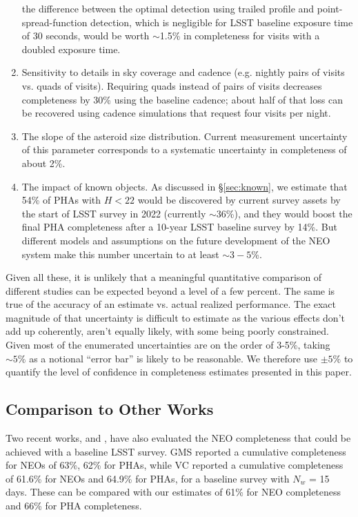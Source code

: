 \begin{enumerate}
          the difference between the optimal detection using trailed profile and point-spread-function
          detection, which is negligible for LSST baseline exposure time of 30 seconds, would be worth $\sim$1.5\%
          in completeness for visits with a doubled exposure time.
\item Sensitivity to details in sky coverage and cadence (e.g. nightly pairs of visits vs. quads of visits).
          Requiring quads instead of pairs of visits decreases completeness by 30\% using the baseline cadence;
          about half of that loss can be recovered using cadence simulations that request four visits per night.
\item The slope of the asteroid size distribution. Current measurement uncertainty of this parameter
          corresponds to a systematic uncertainty in completeness of about 2\%.
\item The impact of known objects. As discussed in \S\ref{sec:known}, we estimate that 54\% of PHAs with $H<22$ would be discovered
          by current survey assets by the start of LSST survey in 2022 (currently $\sim$36\%), and they would
          boost the final PHA completeness after a 10-year LSST baseline survey by 14\%. But different models and assumptions on the future development of the NEO system make this number uncertain to at least $\sim 3-5$\%.
\end{enumerate}

Given all these, it is unlikely that a meaningful quantitative comparison of different studies can be expected beyond a level of a few percent. The same is true of the accuracy of an estimate vs. actual realized performance. The exact magnitude of that uncertainty is difficult to estimate as the various effects don't add up coherently, aren't equally likely, with some being poorly constrained. Given most of the enumerated uncertainties are on the order of 3-5\%, taking $\sim 5\%$ as a notional ``error bar'' is likely to be reasonable. We therefore use $\pm 5\%$ to quantify the level of confidence in completeness estimates presented in this paper.

\subsection{Comparison to Other Works  \label{sec:other}}

Two recent works, \citet*[][hereafter GMS]{GMS2016} and \citet*[][hereafter VC]{VeresChesley2017neo}, 
have also evaluated the NEO completeness that could be achieved with a baseline LSST survey.
GMS reported a cumulative completeness for NEOs of 63\%, 62\% for PHAs,
while VC reported a cumulative completeness of 61.6\%  for NEOs and 64.9\% for PHAs, 
for a baseline survey with $N_w$ = 15 days. These can be compared with our estimates of 61\% for NEO completeness
and 66\% for PHA completeness.

